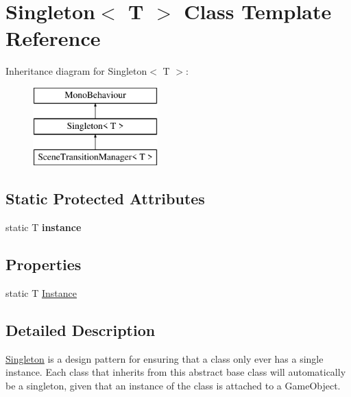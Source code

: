 \hypertarget{class_singleton}{}\section{Singleton$<$ T $>$ Class Template Reference}
\label{class_singleton}
Inheritance diagram for Singleton$<$ T $>$\+:\begin{figure}[H]
\begin{center}
\leavevmode
\includegraphics[height=3.000000cm]{class_singleton}
\end{center}
\end{figure}
\subsection*{Static Protected Attributes}
\begin{DoxyCompactItemize}
\item 
static T {\bfseries instance}\hypertarget{class_singleton_ac160511cdbe3795f209bfdd1874dcacd}{}\label{class_singleton_ac160511cdbe3795f209bfdd1874dcacd}

\end{DoxyCompactItemize}
\subsection*{Properties}
\begin{DoxyCompactItemize}
\item 
static T \hyperlink{class_singleton_a54103e8475b2a352ee759d5732307534}{Instance}
\end{DoxyCompactItemize}


\subsection{Detailed Description}
\hyperlink{class_singleton}{Singleton} is a design pattern for ensuring that a class only ever has a single instance. Each class that inherits from this abstract base class will automatically be a singleton, given that an instance of the class is attached to a Game\+Object.

